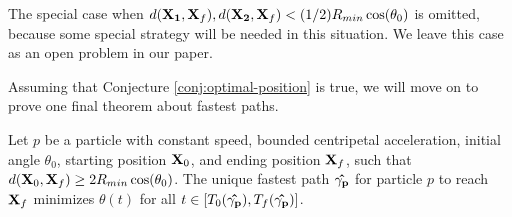 The special case when $d(\bvec{X_1}, \bvec{X}_f), d(\bvec{X_2}, \bvec{X}_f) < (1/2) R_{min} \cos\paren{\theta_0}$ is omitted, because some special strategy will be needed in this situation. We leave this case as an open problem in our paper. 

Assuming that Conjecture \ref{conj:optimal-position} is true, we will move on to prove one final theorem about fastest paths.

\begin{theorem}
  Let  $p$ be a particle with constant speed, bounded centripetal acceleration, initial angle $\theta_0$, starting position $\mathbf{X}_0$, and ending position $\mathbf{X}_f$, such that $d(\bvec{X}_0, \bvec{X}_f) \ge 2 R_{min} \cos\paren{\theta_0}$. The unique fastest path $\mathbf{\hat{\gamma_p}}$ for particle $p$ to reach $\mathbf{X}_f$ minimizes $\theta(t)$ for all $t \in [T_0(\mathbf{\hat{\gamma_p}}), T_f(\mathbf{\hat{\gamma_p}})]$.
  \label{thm:restricted-theta}
\end{theorem}
